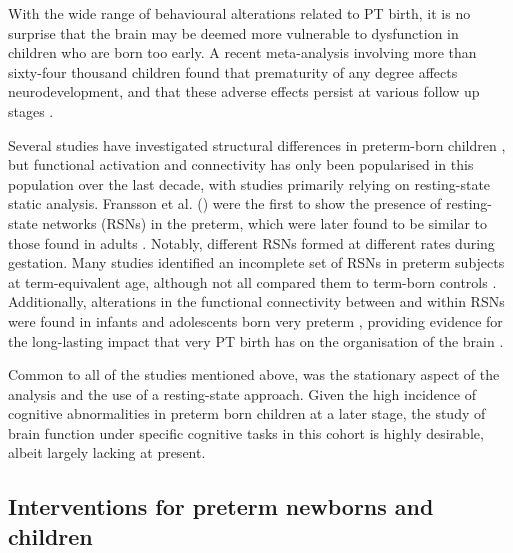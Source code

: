 
With the wide range of behavioural alterations related to PT birth, it is no surprise that the brain may be deemed more vulnerable to dysfunction in children who are born too early. 
A recent meta-analysis involving more than sixty-four thousand children found that prematurity of any degree affects neurodevelopment, and that these adverse effects persist at various follow up stages \citep{Allotey2018}. 



Several studies have investigated structural differences in preterm-born children \citep{Huppi1998b, Brown2014, Kersbergen2014, KostovicSrzentic2019}, but functional activation and connectivity has only been popularised in this population over the last decade, with studies primarily relying on resting-state static analysis. 
Fransson et al. (\citeyear{Fransson2007}) were the first to show the presence of resting-state networks (RSNs) in the preterm, which were later found to be similar to those found in adults \citep{Doria2010}. 
Notably, different RSNs formed at different rates during gestation. Many studies identified an incomplete set of RSNs in preterm subjects at term-equivalent age, although not all compared them to term-born controls \citep{Lin2008, Fransson2007, Fransson2011, Gao2015, Lordier2019}.
Additionally, alterations in the functional connectivity between and within RSNs were found in infants \citep{Gozdas2018} and adolescents \citep{Wehrle2018} born very preterm , providing evidence for the long-lasting impact that very PT birth has on the organisation of the brain \citep{Damaraju2010,White2014,Johns2019}. 

Common to all of the studies mentioned above, was the stationary aspect of the analysis and the use of a resting-state approach. 
Given the high incidence of cognitive abnormalities in preterm born children at a later stage, the study of brain function under specific cognitive tasks in this cohort is highly desirable, albeit largely lacking at present.

\subsection{Interventions for preterm newborns and children}

